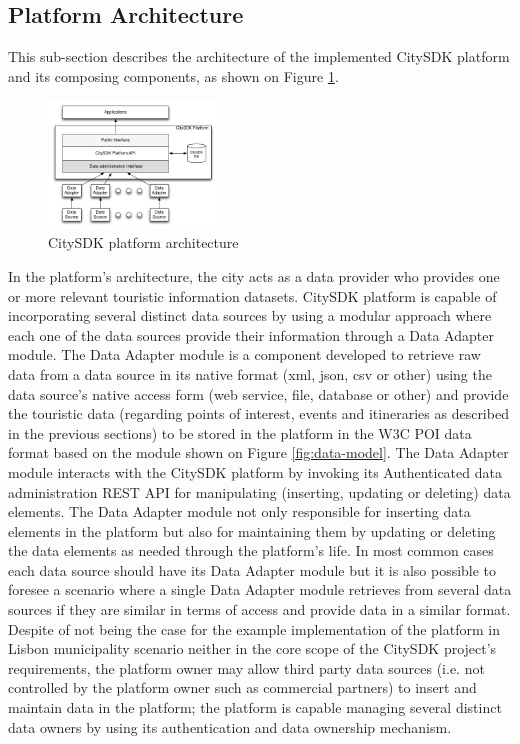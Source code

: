 \documentclass[times]{ettauth}
\begin{document}
\subsection{Platform Architecture}
This sub-section describes the architecture of the implemented CitySDK platform and its composing components, as shown on Figure \ref{fig:architecture}. 

\begin{figure}[!ht]
\centering
\includegraphics[width=0.4\textwidth]{images/architecture}
\caption{CitySDK platform architecture}
\label{fig:architecture}
\end{figure}

In the platform's architecture, the city acts as a data provider who provides one or more relevant touristic information datasets. CitySDK platform is capable of incorporating several distinct data sources by using a modular approach where each one of the data sources provide their information through a Data Adapter module. The Data Adapter module is a component developed to retrieve raw data from a data source in its native format (xml, json, csv or other) using the data source's native access form (web service, file, database or other) and provide the touristic data (regarding points of interest, events and itineraries as described in the previous sections) to be stored in the platform in the W3C POI data format based on the module shown on Figure \ref{fig:data-model}. The Data Adapter module interacts with the CitySDK platform by invoking its Authenticated data administration REST API for manipulating (inserting, updating or deleting) data elements. The Data Adapter module not only responsible for inserting data elements in the platform but also for maintaining them by updating or deleting the data elements as needed through the platform's life. In most common cases each data source should have its Data Adapter module but it is also possible to foresee a scenario where a single Data Adapter module retrieves from several data sources if they are similar in terms of access and provide data in a similar format. Despite of not being the case for the example implementation of the platform in Lisbon municipality scenario neither in the core scope of the CitySDK project's requirements, the platform owner may allow third party data sources (i.e. not controlled by the platform owner such as commercial partners) to insert and maintain data in the platform; the platform is capable managing several distinct data owners by using its authentication and data ownership mechanism.
\end{document}
